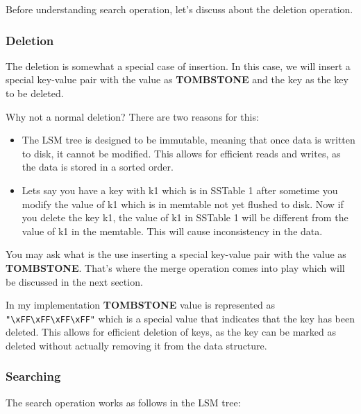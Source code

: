 \documentclass{article}
\begin{document}
\noindent Before understanding search operation, let's discuss about the deletion operation.

\subsubsection{Deletion}
\noindent The deletion is somewhat a special case of insertion. In this case, we will insert a special key-value pair with the value as \textbf{TOMBSTONE} and the key as the key to be deleted.

\noindent Why not a normal deletion? There are two reasons for this:
\begin{itemize}
    \item The LSM tree is designed to be immutable, meaning that once data is written to disk, it cannot be modified. This allows for efficient reads and writes, as the data is stored in a sorted order.
    \item Lets say you have a key with k1 which is in SSTable 1 after sometime you modify the value of k1 which is in memtable not yet flushed to disk. Now if you delete the key k1, the value of k1 in SSTable 1 will be different from the value of k1 in the memtable. This will cause inconsistency in the data.
\end{itemize}

\noindent You may ask what is the use inserting a special key-value pair with the value as \textbf{TOMBSTONE}. That's where the merge operation comes into play which will be discussed in the next section.

\noindent In my implementation \textbf{TOMBSTONE} value is represented as \texttt{"\texttt{\textbackslash}xFF\texttt{\textbackslash}xFF\texttt{\textbackslash}xFF\texttt{\textbackslash}xFF"} which is a special value that indicates that the key has been deleted. This allows for efficient deletion of keys, as the key can be marked as deleted without actually removing it from the data structure.

\subsubsection{Searching}
\noindent The search operation works as follows in the LSM tree:
\end{document}
